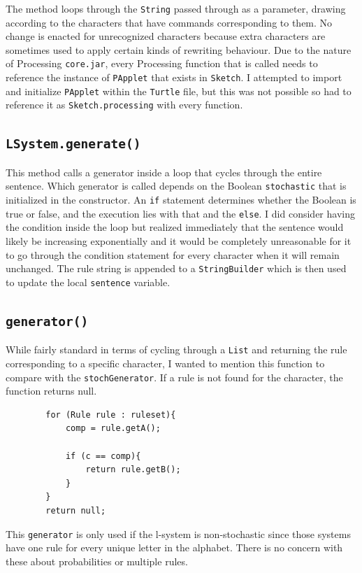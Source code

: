 \documentclass[]{final_report}
\begin{document}
The method loops through the \verb|String| passed through as a parameter, drawing according to the characters that have commands corresponding to them. No change is enacted for unrecognized characters because extra characters are sometimes used to apply certain kinds of rewriting behaviour. Due to the nature of Processing \verb|core.jar|, every Processing function that is called needs to reference the instance of \verb|PApplet| that exists in \verb|Sketch|. I attempted to import and initialize \verb|PApplet| within the \verb|Turtle| file, but this was not possible so had to reference it as \verb|Sketch.processing| with every function.

\subsection*{\texttt{LSystem.generate()}}

This method calls a generator inside a loop that cycles through the entire sentence. Which generator is called depends on the Boolean \verb|stochastic| that is initialized in the constructor. An \verb|if| statement determines whether the Boolean is true or false, and the execution lies with that and the \verb|else|. I did consider having the condition inside the loop but realized immediately that the sentence would likely be increasing exponentially and it would be completely unreasonable for it to go through the condition statement for every character when it will remain unchanged. The rule string is appended to a \verb|StringBuilder| which is then used to update the local \verb|sentence| variable.

\subsection*{\texttt{generator()}}

While fairly standard in terms of cycling through a \verb|List| and returning the rule corresponding to a specific character, I wanted to mention this function to compare with the \verb|stochGenerator|. If a rule is not found for the character, the function returns null.
\begin{verbatim}
        for (Rule rule : ruleset){
            comp = rule.getA();

            if (c == comp){
                return rule.getB();
            }
        }
        return null;
\end{verbatim}

This \verb|generator| is only used if the l-system is non-stochastic since those systems have one rule for every unique letter in the alphabet. There is no concern with these about probabilities or multiple rules.
\end{document}
